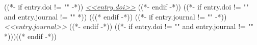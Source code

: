 {
    ((*- if entry.doi != "" -*))
    \small\textit{\href{<<entry.doi_url>>}{<<entry.doi>>}}
    ((*- endif -*))
    ((*- if entry.doi != "" and entry.journal != "" *)) (((* endif -*))
    ((*- if entry.journal != "" -*))
    \small\textit{<<entry.journal>>}
    ((*- endif -*))
    ((*- if entry.doi != "" and entry.journal != "" *)))((* endif -*))
}
\resumeItemListStart
\resumeItemListEnd